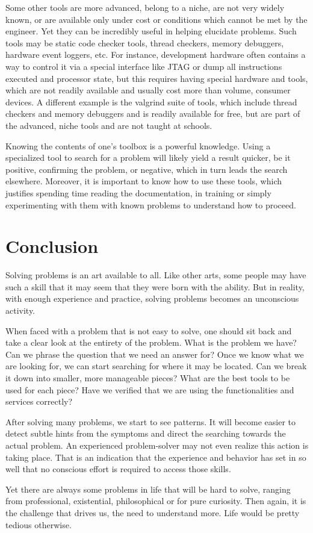 Some other tools are more advanced, belong to a niche, are not very widely known, or are available only under cost or conditions which cannot be met by the engineer. Yet they can be incredibly useful in helping elucidate problems. Such tools may be static code checker tools, thread checkers, memory debuggers, hardware event loggers, etc. For instance, development hardware often contains a way to control it via a special interface like JTAG or dump all instructions executed and processor state, but this requires having special hardware and tools, which are not readily available and usually cost more than volume, consumer devices. A different example is the valgrind suite of tools, which include thread checkers and memory debuggers and is readily available for free, but are part of the advanced, niche tools and are not taught at schools.

Knowing the contents of one’s toolbox is a powerful knowledge. Using a specialized tool to search for a problem will likely yield a result quicker, be it positive, confirming the problem, or negative, which in turn leads the search elsewhere. Moreover, it is important to know how to use these tools, which justifies spending time reading the documentation, in training or simply experimenting with them with known problems to understand how to proceed.

\section*{Conclusion}

Solving problems is an art available to all. Like other arts, some people may have such a skill that it may seem that they were born with the ability. But in reality, with enough experience and practice, solving problems becomes an unconscious activity.

When faced with a problem that is not easy to solve, one should sit back and take a clear look at the entirety of the problem. What is the problem we have? Can we phrase the question that we need an answer for? Once we know what we are looking for, we can start searching for where it may be located. Can we break it down into smaller, more manageable pieces? What are the best tools to be used for each piece? Have we verified that we are using the functionalities and services correctly?

After solving many problems, we start to see patterns. It will become easier to detect subtle hints from the symptoms and direct the searching towards the actual problem. An experienced problem-solver may not even realize this action is taking place. That is an indication that the experience and behavior has set in so well that no conscious effort is required to access those skills.

Yet there are always some problems in life that will be hard to solve, ranging from professional, existential, philosophical or for pure curiosity. Then again, it is the challenge that drives us, the need to understand more. Life would be pretty tedious otherwise.
